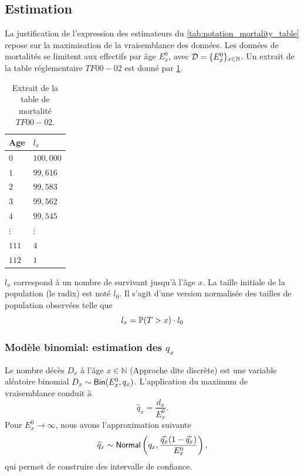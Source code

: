 \subsection{Estimation}
La justification de l'expression des estimateurs du \cref{tab:notation_mortality_table} repose sur la maximisation de la vraisemblance des données. Les données de mortalités se limitent aux effectifs par âge $E^0_x$, avec $\mathcal{D} = \{E^0_x\}_{x\in\mathbb{N}}$. Un extrait de la table réglementaire $TF 00-02$ est donné par \cref{tab:TF002}.
\begin{table}[ht!]
\centering
\begin{tabular}{ll}
  \hline
 Age & $l_x$ \\ 
  \hline
 $0$ & $100,000 $\\ 
 $1$ &$ 99,616 $\\ 
 $2$ &$ 99,583 $\\ 
 $3$ &$ 99,562 $\\ 
 $4$ &$ 99,545 $\\ 
 $\vdots$ &$\vdots $\\
 $111$ & $4$ \\ 
 $112$ & $1$ \\ 
   \hline
\end{tabular}
\caption{Extrait de la table de mortalité $TF 00-02$.}
\label{tab:TF002}
\end{table}
\begin{remark}
$l_x$ correspond à un nombre de survivant jusqu'à l'âge $x$. La taille initiale de la population (le radix) est noté $l_0$. Il s'agit d'une version normalisée des tailles de population observées telle que 
$$
l_x = \mathbb{P}(T>x)\cdot l_0
$$
\end{remark}

\subsubsection{Modèle binomial: estimation des $q_x$}\label{ssec:deces_binomial}
Le nombre décès $D_x$ à l'âge $x\in\mathbb{N}$ (Approche dite discrète) est une variable aléatoire binomial $D_x\sim \mathsf{Bin}(E^0_x, q_x)$. L'application du maximum de vraisemblance conduit à 
$$
\widehat{q}_x = \frac{d_x}{E^0_x}.
$$
Pour $E^0_x\rightarrow \infty$, nous avons l'approximation suivante 
$$
\widehat{q}_x\sim\mathsf{Normal}\left(q_x, \frac{\widehat{q_x}(1-\widehat{q_x})}{E^0_x}\right),
$$
qui permet de construire des intervalle de confiance.
